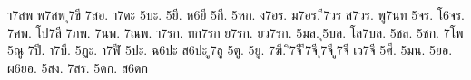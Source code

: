 {า7สพ
พ7สพ
ุ7ขี
7สอ.
า7ดะ
5บะ.
5ยี.
ห6ยี
5กี.
5หก.
ง7อร.
ม7อร.
ี7วร
ส7วร.
พู7นท
5จร.
โ6จร.
7ศพ.
โป7ลี
7ภพ.
7นพ.
7ณพ.
า7รก.
ทก7รก
ย7รก.
ยว7รก.
5มล.
ุ5บล.
โล7บล.
5ชล.
5ชก.
7โพ
5ณู
7ปี.
า7บี.
5ฏะ.
า7ฬี
5ปะ.
ฉ6ปะ
ส6ปะ
ู7ลู
5ตู.
5ยู.
7ฆี.
ิ7จี
ี7จี
ุ7จี
ู7จี
เว7จี
5ศี.
5มน.
5ยอ.
ผ6ยอ.
5สง.
7สร.
5ดก.
ส6ดก
}
